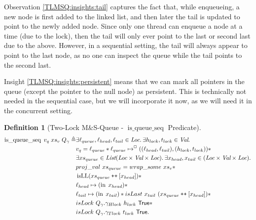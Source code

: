 \documentclass[twoside,11pt,openright]{report}
\newtheorem{definition}{Definition}[section]
\newcommand{\isqueueseq}{\operatorname{is\_queue\_seq}}
\newcommand{\isLL}{\operatorname{isLL}}
\newcommand{\nIn}[1]{\operatorname{in} \; #1}
\newcommand\catenate{\mathbin{\text{\ttfamily\upshape ++}}}
\begin{document}
Observation \ref{TLMSQ:insights:tail} captures the fact that, while enqueueing, a new node is first added to the linked list, and then later the tail is updated to point to the newly added node. Since only one thread can enqueue a node at a time (due to the lock), then the tail will only ever point to the last or second last due to the above. However, in a sequential setting, the tail will always appear to point to the last node, as no one can inspect the queue while the tail points to the second last.

Insight \ref{TLMSQ:insights:persistent} means that we can mark all pointers in the queue (except the pointer to the null node) as persistent. This is technically not needed in the sequential case, but we will incorporate it now, as we will need it in the concurrent setting.

\begin{definition}[Two-Lock M\&S-Queue - $\isqueueseq$ Predicate]\label{TLMSQ:spec:isqueueseq}
\begin{align*}
  \isqueueseq \; v_q \; xs_v \; Q_\gname \eqdef &\Exists \loc_{queue}, \loc_{head}, \loc_{tail} \in \Loc . \Exists h_{lock}, t_{lock} \in \Val . \\
  &v_q = \loc_{queue} \star \loc_{queue} \mapsto^{\persistently} ((\loc_{head}, \loc_{tail}), (h_{lock}, t_{lock})) \star\\
  &\Exists xs_{queue} \in \List (\Loc \times \Val \times \Loc) . \Exists x_{head}, x_{tail} \in (\Loc \times \Val \times \Loc) .\\
	&proj\_val \ xs_{queue} = wrap\_some \ xs_v \star\\
	&\isLL (xs_{queue} \catenate [x_{head}]) \star\\
	&\loc_{head} \mapsto (\nIn{x_{head}}) \star\\
	&\loc_{tail} \mapsto (\nIn{x_{tail}}) \star isLast \ x_{tail} \ (xs_{queue} \catenate [x_{head}]) \star\\
	&isLock \ Q_\gname.\gname_{Hlock} \ h_{lock} \ \TRUE \star\\
	&isLock \ Q_\gname.\gname_{Tlock} \ t_{lock} \ \TRUE.
\end{align*}
\end{definition}
\end{document}
